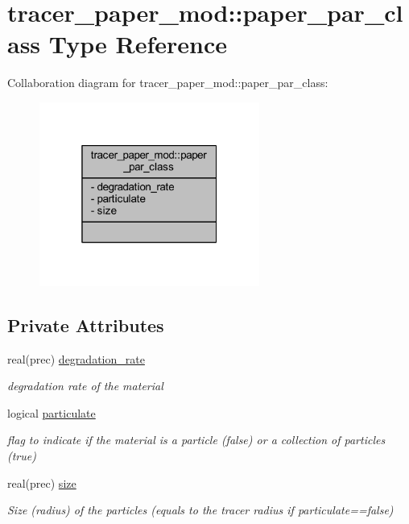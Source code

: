 \hypertarget{structtracer__paper__mod_1_1paper__par__class}{}\section{tracer\+\_\+paper\+\_\+mod\+:\+:paper\+\_\+par\+\_\+class Type Reference}
\label{structtracer__paper__mod_1_1paper__par__class}


Collaboration diagram for tracer\+\_\+paper\+\_\+mod\+:\+:paper\+\_\+par\+\_\+class\+:\nopagebreak
\begin{figure}[H]
\begin{center}
\leavevmode
\includegraphics[width=205pt]{structtracer__paper__mod_1_1paper__par__class__coll__graph}
\end{center}
\end{figure}
\subsection*{Private Attributes}
\begin{DoxyCompactItemize}
\item 
real(prec) \mbox{\hyperlink{structtracer__paper__mod_1_1paper__par__class_ac9893368ff4ec076f4604d749c2bb391}{degradation\+\_\+rate}}
\begin{DoxyCompactList}\small\item\em degradation rate of the material \end{DoxyCompactList}\item 
logical \mbox{\hyperlink{structtracer__paper__mod_1_1paper__par__class_a794fb1c69237803f68cb68143273242c}{particulate}}
\begin{DoxyCompactList}\small\item\em flag to indicate if the material is a particle (false) or a collection of particles (true) \end{DoxyCompactList}\item 
real(prec) \mbox{\hyperlink{structtracer__paper__mod_1_1paper__par__class_aeb0b4d046983cd2f631822e80e1600c4}{size}}
\begin{DoxyCompactList}\small\item\em Size (radius) of the particles (equals to the tracer radius if particulate==false) \end{DoxyCompactList}\end{DoxyCompactItemize}


